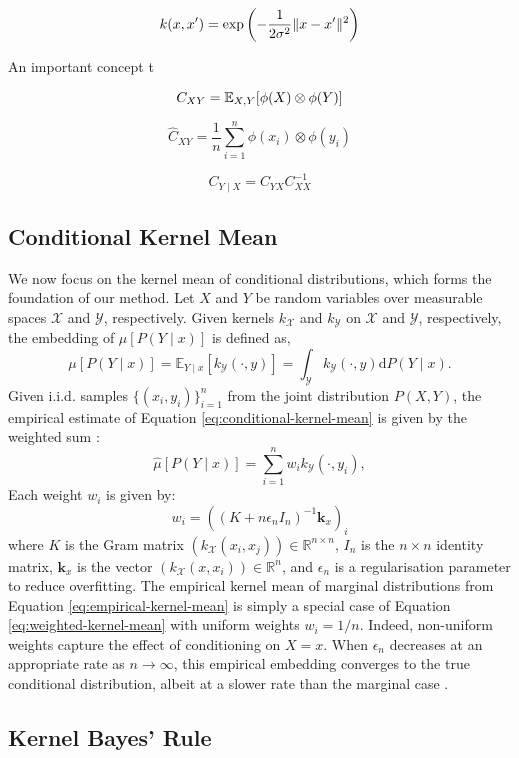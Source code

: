 \begin{equation}
  k(x,x') = \exp\left(-\frac{1}{2\sigma^2} \lVert x-x'\rVert^2 \right)
\end{equation}

An important concept t

\begin{equation}
  C_{XY} = \mathbb{E}_{X, Y}[\phi(X) \otimes \phi(Y)]
\end{equation}

\begin{equation}
  \widehat{C}_{XY} = \frac{1}{n} \sum_{i=1}^n \phi(x_i) \otimes \phi(y_i)
\end{equation}

\begin{equation}
  C_{Y \mid X} = C_{YX} C_{XX}^{-1}
\end{equation}

\subsection{Conditional Kernel Mean}
We now focus on the kernel mean of conditional distributions, which forms the foundation of our method. Let $X$ and $Y$ be random variables over measurable spaces $\mathcal{X}$ and $\mathcal{Y}$, respectively. Given kernels $k_\mathcal{X}$ and $k_\mathcal{Y}$ on $\mathcal{X}$ and $\mathcal{Y}$, respectively, the embedding of $\mu[P(Y \mid x)]$ is defined as,
%
\begin{equation}
  \label{eq:conditional-kernel-mean}
  \mu[P(Y \mid x)] = \mathbb{E}_{Y \mid x}[k_\mathcal{Y}(\cdot, y)] = \int_\mathcal{Y} k_\mathcal{Y}(\cdot, y) \mathrm{d}{P(Y \mid x)}.
\end{equation}
%
Given i.i.d. samples $\{ (x_i, y_i) \}_{i=1}^n$ from the joint distribution $P(X, Y)$, the empirical estimate of Equation \ref{eq:conditional-kernel-mean} is given by the weighted sum \cite{song2009hilbert}:
%
\begin{equation}
  \label{eq:weighted-kernel-mean}
  \widehat{\mu}[P(Y \mid x)] = \sum_{i=1}^n w_i k_\mathcal{Y}(\cdot, y_i),
\end{equation}
%
Each weight $w_i$ is given by:
\begin{equation}
w_i = ((K + n \epsilon_n I_n)^{-1} \mathbf{k}_x)_i
\end{equation}
%
where $K$ is the Gram matrix $(k_\mathcal{X}(x_i, x_j)) \in \mathbb{R}^{n \times n}$, $I_n$ is the $n \times n$ identity matrix, $\mathbf{k}_x$ is the vector $(k_\mathcal{X}(x, x_i)) \in \mathbb{R}^n$, and $\epsilon_n$ is a regularisation parameter to reduce overfitting.
%
The empirical kernel mean of marginal distributions from Equation \ref{eq:empirical-kernel-mean} is simply a special case of Equation \ref{eq:weighted-kernel-mean} with uniform weights $w_i = 1/n$. Indeed, non-uniform weights capture the effect of conditioning on $X = x$. When $\epsilon_n$ decreases at an appropriate rate as $n \rightarrow \infty$, this empirical embedding converges to the true conditional distribution, albeit at a slower rate than the marginal case \cite{song2009hilbert}.

\subsection{Kernel Bayes' Rule}
